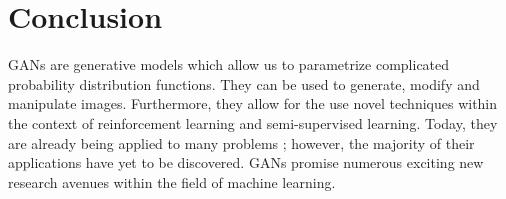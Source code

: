 \documentclass[11pt]{article}
\begin{document}
\section{Conclusion}
GANs are generative models which allow us to parametrize complicated probability distribution functions. They can be used to generate, modify and manipulate images. Furthermore, they allow for the use novel techniques within the context of reinforcement learning and semi-supervised learning. Today, they are already being applied to many problems \citep{genmodelingopenai}; however, the majority of their applications have yet to be discovered. GANs promise numerous exciting new research avenues within the field of machine learning.



\end{document}
